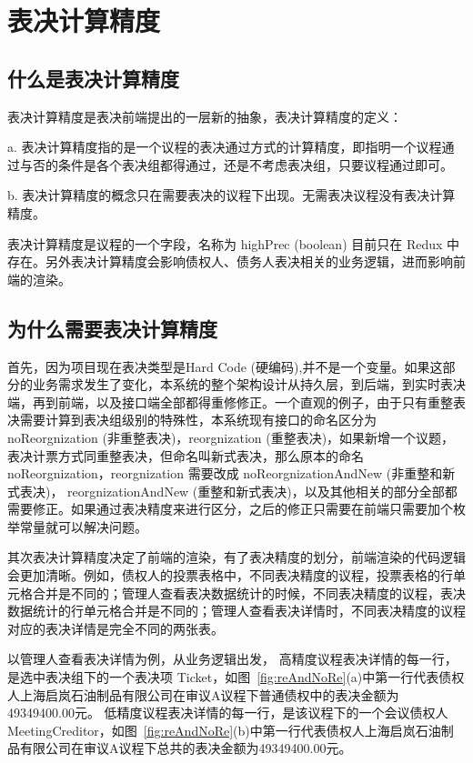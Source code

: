   \section{表决计算精度}
  \subsection{什么是表决计算精度}
  表决计算精度是表决前端提出的一层新的抽象，表决计算精度的定义：

  \quad{}a. 表决计算精度指的是一个议程的表决通过方式的计算精度，即指明一个议程通过与否的条件是各个表决组都得通过，还是不考虑表决组，只要议程通过即可。


  \quad{}b. 表决计算精度的概念只在需要表决的议程下出现。无需表决议程没有表决计算精度。

  表决计算精度是议程的一个字段，名称为 highPrec (boolean) 目前只在 Redux 中存在。另外表决计算精度会影响债权人、债务人表决相关的业务逻辑，进而影响前端的渲染。

  \subsection{为什么需要表决计算精度}

  首先，因为项目现在表决类型是Hard Code (硬编码),并不是一个变量。如果这部分的业务需求发生了变化，本系统的整个架构设计从持久层，到后端，到实时表决端，再到前端，以及接口端全部都得重修修正。一个直观的例子，由于只有重整表决需要计算到表决组级别的特殊性，本系统现有接口的命名区分为 noReorgnization (非重整表决)，reorgnization (重整表决)，如果新增一个议题，表决计票方式同重整表决，但命名叫新式表决，那么原本的命名 noReorgnization，reorgnization 需要改成 noReorgnizationAndNew (非重整和新式表决)， reorgnizationAndNew (重整和新式表决)，以及其他相关的部分全部都需要修正。如果通过表决精度来进行区分，之后的修正只需要在前端只需要加个枚举常量就可以解决问题。

  其次表决计算精度决定了前端的渲染，有了表决精度的划分，前端渲染的代码逻辑会更加清晰。例如，债权人的投票表格中，不同表决精度的议程，投票表格的行单元格合并是不同的；管理人查看表决数据统计的时候，不同表决精度的议程，表决数据统计的行单元格合并是不同的；管理人查看表决详情时，不同表决精度的议程对应的表决详情是完全不同的两张表。
  
  以管理人查看表决详情为例，从业务逻辑出发，
  高精度议程表决详情的每一行，是选中表决组下的一个表决项 Ticket，如图~\ref{fig:reAndNoRe}(a)中第一行代表债权人上海启岚石油制品有限公司在审议A议程下普通债权中的表决金额为49349400.00元。
  低精度议程表决详情的每一行，是该议程下的一个会议债权人 MeetingCreditor，如图~\ref{fig:reAndNoRe}(b)中第一行代表债权人上海启岚石油制品有限公司在审议A议程下总共的表决金额为49349400.00元。

